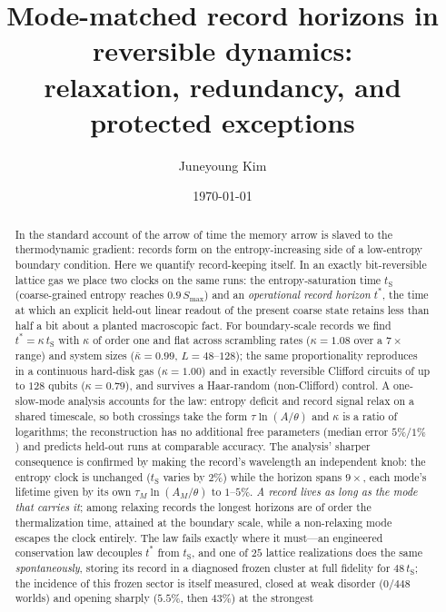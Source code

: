 \documentclass[aps,pre,twocolumn,superscriptaddress,nofootinbib,longbibliography]{revtex4-2}
\newcommand{\tS}{t_{\mathrm{S}}}
\newcommand{\tstar}{t^{*}}
\newcommand{\Smax}{S_{\max}}
\newcommand{\kap}{\kappa}
\begin{document}
\title{Mode-matched record horizons in reversible dynamics:\\
relaxation, redundancy, and protected exceptions}

\author{Juneyoung Kim}

\date{\today}

\begin{abstract}
In the standard account of the arrow of time the memory arrow is slaved to the
thermodynamic gradient: records form on the entropy-increasing side of a low-entropy
boundary condition. Here we quantify record-keeping itself. In an exactly bit-reversible
lattice gas we place two clocks on the same runs: the entropy-saturation time $\tS$
(coarse-grained entropy reaches $0.9\,\Smax$) and an \emph{operational record horizon}
$\tstar$, the time at which an explicit held-out linear readout of the present coarse state
retains less than half a bit about a planted macroscopic fact. For boundary-scale records
we find $\tstar=\kap\,\tS$ with $\kap$ of order one and flat across scrambling rates
($\kap=1.08$ over a $7\times$ range) and system sizes ($\bar\kap=0.99$, $L=48$--$128$); the
same proportionality reproduces in a continuous hard-disk gas ($\kap=1.00$) and in exactly
reversible Clifford circuits of up to $128$ qubits ($\kap=0.79$), and survives a
Haar-random (non-Clifford) control. A one-slow-mode analysis accounts for the law: entropy
deficit and record signal relax on a shared timescale, so both crossings take the form
$\tau\ln(A/\theta)$ and $\kap$ is a ratio of logarithms; the reconstruction has no
additional free parameters (median error $5\%$/$1\%$) and predicts held-out runs at
comparable accuracy. The analysis' sharper consequence is confirmed by making the record's
wavelength an independent knob: the entropy clock is unchanged ($\tS$ varies by $2\%$)
while the horizon spans $9\times$, each mode's lifetime given by its own
$\tau_M\ln(A_M/\theta)$ to $1$--$5\%$. \emph{A record lives as long as the mode that
carries it}; among relaxing records the longest horizons are of order the thermalization
time, attained at the boundary scale, while a non-relaxing mode escapes the clock
entirely. The law fails exactly where it must---an engineered conservation law decouples
$\tstar$ from $\tS$, and one of $25$ lattice realizations does the same
\emph{spontaneously}, storing its record in a diagnosed frozen cluster at full fidelity
for $48\,\tS$; the incidence of this frozen sector is itself measured, closed at weak
disorder ($0/448$ worlds) and opening sharply ($5.5\%$, then $43\%$) at the strongest

\end{abstract}
\end{document}
